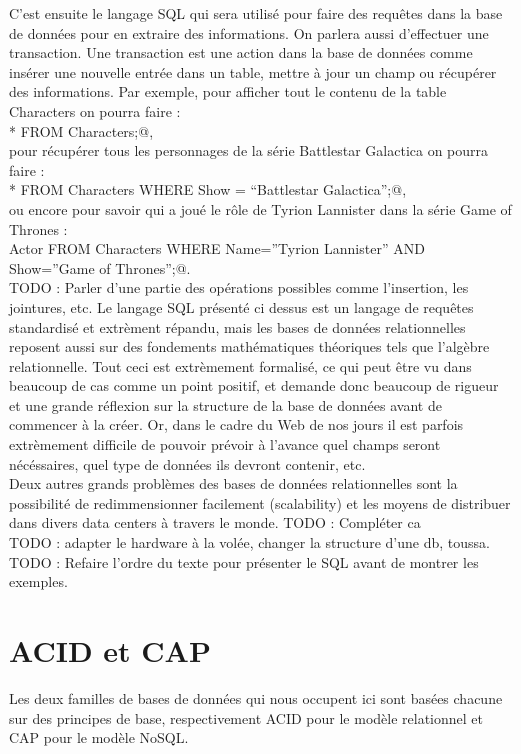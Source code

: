\documentclass[11pt]{article}
\begin{document}
C'est ensuite le langage SQL qui sera utilisé pour faire des requêtes dans la base de données pour en extraire des informations. On parlera aussi d'effectuer une transaction. Une transaction est une action dans la base de données comme insérer une nouvelle entrée dans un table, mettre à jour un champ ou récupérer des informations. Par exemple, pour afficher tout le contenu de la table Characters on pourra faire : \\
\verb@SELECT * FROM Characters;@, \\
pour récupérer tous les personnages de la série Battlestar Galactica on pourra faire : \\
\verb@SELECT * FROM Characters WHERE Show = ``Battlestar Galactica'';@, \\
ou encore pour savoir qui a joué le rôle de Tyrion Lannister dans la série Game of Thrones : \\
\verb@SELECT Actor FROM Characters WHERE Name=''Tyrion Lannister'' AND Show=''Game of Thrones'';@. \\ 
TODO : Parler d'une partie des opérations possibles comme l'insertion, les jointures, etc.
Le langage SQL présenté ci dessus est un langage de requêtes standardisé et extrèment répandu, mais les bases de données relationnelles reposent aussi sur des fondements mathématiques théoriques tels que l'algèbre relationnelle. Tout ceci est extrèmement formalisé, ce qui peut être vu dans beaucoup de cas comme un point positif, et demande donc beaucoup de rigueur et une grande réflexion sur la structure de la base de données avant de commencer à la créer. Or, dans le cadre du Web de nos jours il est parfois extrèmement difficile de pouvoir prévoir à l'avance quel champs seront nécéssaires, quel type de données ils devront contenir, etc. \\
Deux autres grands problèmes des bases de données relationnelles sont la possibilité de redimmensionner facilement (scalability) et les moyens de distribuer dans divers data centers à travers le monde. TODO : Compléter ca \\
TODO : adapter le hardware à la volée, changer la structure d'une db, toussa. \\
TODO : Refaire l'ordre du texte pour présenter le SQL avant de montrer les exemples.

\section{ACID et CAP}
Les deux familles de bases de données qui nous occupent ici sont basées chacune sur des principes de base, respectivement ACID pour le modèle relationnel et CAP pour le modèle NoSQL. \\
\end{document}
